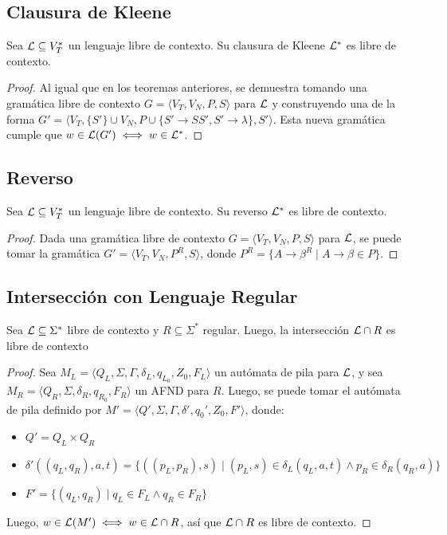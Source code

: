 \subsection{Clausura de Kleene}

\begin{theorem*}
    Sea $\mathcal{L} \subseteq V_T^*$ un lenguaje libre de contexto. Su clausura de Kleene $\mathcal{L}^*$ es libre de contexto.
\end{theorem*}
\begin{proof}
    Al igual que en los teoremas anteriores, se demuestra tomando una gramática libre de contexto $G = \langle V_T, V_N, P, S \rangle$ para $\mathcal{L}$ y construyendo una de la forma $G' = \langle V_T, \{S'\} \cup V_N, P \cup \{S' \to S S', S' \to \lambda\}, S' \rangle$. Esta nueva gramática cumple que $w \in \mathcal{L}(G') \iff w \in \mathcal{L}^*$.
\end{proof}

\subsection{Reverso}

\begin{theorem*}
    Sea $\mathcal{L} \subseteq V_T^*$ un lenguaje libre de contexto. Su reverso $\mathcal{L}^*$ es libre de contexto.
\end{theorem*}
\begin{proof}
    Dada una gramática libre de contexto $G = \langle V_T, V_N, P, S \rangle$ para $\mathcal{L}$, se puede tomar la gramática $G' = \langle V_T, V_N, P^R, S \rangle$, donde $P^R = \{A \to \beta^R \mid A \to \beta \in P\}$.
\end{proof}

\subsection{Intersección con Lenguaje Regular}

\begin{theorem*}
    Sea $\mathcal{L} \subseteq \Sigma^*$ libre de contexto y $R \subseteq \Sigma^*$ regular. Luego, la intersección $\mathcal{L} \cap R$ es libre de contexto
\end{theorem*}
\begin{proof}
    Sea $M_L = \langle Q_L, \Sigma, \Gamma, \delta_L, q_{L_0}, Z_0, F_L \rangle$ un autómata de pila para $\mathcal{L}$, y sea $M_R = \langle Q_R, \Sigma, \delta_R, q_{R_0}, F_R \rangle$ un AFND para $R$. Luego, se puede tomar el autómata de pila definido por $M' = \langle Q', \Sigma, \Gamma, \delta', q_0', Z_0, F' \rangle$, donde:
    \begin{itemize}
        \item $Q' = Q_L \times Q_R$
        \item $\delta'((q_L, q_R), a, t) = \{((p_L, p_R), s) \mid (p_L, s) \in \delta_L(q_L, a, t) \land p_R \in \delta_R(q_R, a)\}$
        \item $F' = \{(q_L, q_R) \mid q_L \in F_L \land q_R \in F_R\}$
    \end{itemize}

    Luego, $w \in \mathcal{L}(M') \iff w \in \mathcal{L} \cap R$, así que $\mathcal{L} \cap R$ es libre de contexto.
\end{proof}

